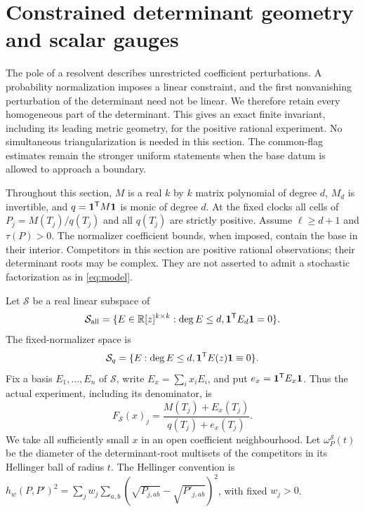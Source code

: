\section{Constrained determinant geometry and scalar gauges}
\label{sec:constrained-newton}
The pole of a resolvent describes unrestricted coefficient perturbations.
A probability normalization imposes a linear constraint, and the first
nonvanishing perturbation of the determinant need not be linear. We
therefore retain every homogeneous part of the determinant. This gives
an exact finite invariant, including its leading metric geometry, for
the positive rational experiment. No simultaneous triangularization is
needed in this section. The common-flag estimates remain the stronger
uniform statements when the base datum is allowed to approach a boundary.

Throughout this section, $M$ is a real $k$ by $k$ matrix polynomial of
degree $d$, $M_d$ is invertible, and
$q=\mathbf 1^{\mathsf T}M\mathbf 1$ is monic of degree $d$. At the fixed clocks
all cells of $P_j=M(T_j)/q(T_j)$ and all $q(T_j)$ are strictly positive.
Assume $\ell\ge d+1$ and $\tau(P)>0$. The normalizer coefficient
bounds, when imposed, contain the base in their interior. Competitors
in this section are positive rational observations; their determinant
roots may be complex. They are not asserted to admit a stochastic
factorization as in \eqref{eq:model}.

Let $\mathcal S$ be a real linear subspace of
\[
 \mathcal S_{\rm all}
 =\{E\in\mathbb R[z]^{k\times k}:\deg E\le d,
                         \mathbf 1^{\mathsf T}E_d\mathbf 1=0\}.
\]
The fixed-normalizer space is
\[
 \mathcal S_q=\{E:\deg E\le d,
                         \mathbf 1^{\mathsf T}E(z)\mathbf 1\equiv0\}.
\]
Fix a basis $E_1,\ldots,E_n$ of $\mathcal S$, write
$E_x=\sum_i x_iE_i$, and put $e_x=\mathbf 1^{\mathsf T}E_x\mathbf 1$.
Thus the actual experiment, including its denominator, is
\begin{equation}\label{eq:newton-observation}
 F_{\mathcal S}(x)_j=\frac{M(T_j)+E_x(T_j)}{q(T_j)+e_x(T_j)}.
\end{equation}
We take all sufficiently small $x$ in an open coefficient neighbourhood.
Let $\omega_P^{\mathcal S}(t)$ be the diameter of the determinant-root
multisets of the competitors in its Hellinger ball of radius $t$.
The Hellinger convention is
$h_w(P,P')^2=\sum_jw_j\sum_{a,b}(\sqrt{P_{j,ab}}-
\sqrt{P'_{j,ab}})^2$, with fixed $w_j>0$.

